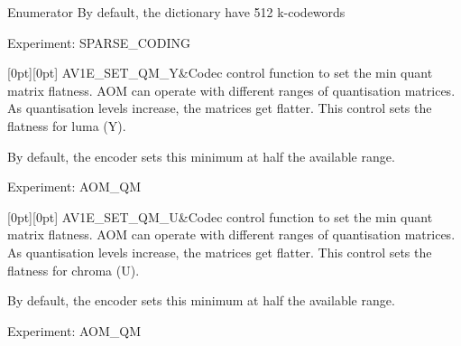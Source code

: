 \begin{DoxyEnumFields}{Enumerator}
By default, the dictionary have 512 k-\/codewords

Experiment\+: S\+P\+A\+R\+S\+E\+\_\+\+C\+O\+D\+I\+NG \\
\hline

[0pt][0pt]{}\mbox{\label{group__aom__encoder_ggae78dde67a6d78f332e9bdba0dde42db5a49c0eb54ab5a4d7d6cbc97d97f3029f8}} 
A\+V1\+E\+\_\+\+S\+E\+T\+\_\+\+Q\+M\+\_\+Y&Codec control function to set the min quant matrix flatness. A\+OM can operate with different ranges of quantisation matrices. As quantisation levels increase, the matrices get flatter. This control sets the flatness for luma (Y).

By default, the encoder sets this minimum at half the available range.

Experiment\+: A\+O\+M\+\_\+\+QM \\
\hline

[0pt][0pt]{}\mbox{\label{group__aom__encoder_ggae78dde67a6d78f332e9bdba0dde42db5a5afff92787c68c2b5c50e3cfb9938504}} 
A\+V1\+E\+\_\+\+S\+E\+T\+\_\+\+Q\+M\+\_\+U&Codec control function to set the min quant matrix flatness. A\+OM can operate with different ranges of quantisation matrices. As quantisation levels increase, the matrices get flatter. This control sets the flatness for chroma (U).

By default, the encoder sets this minimum at half the available range.

Experiment\+: A\+O\+M\+\_\+\+QM \\
\hline


\end{DoxyEnumFields}
